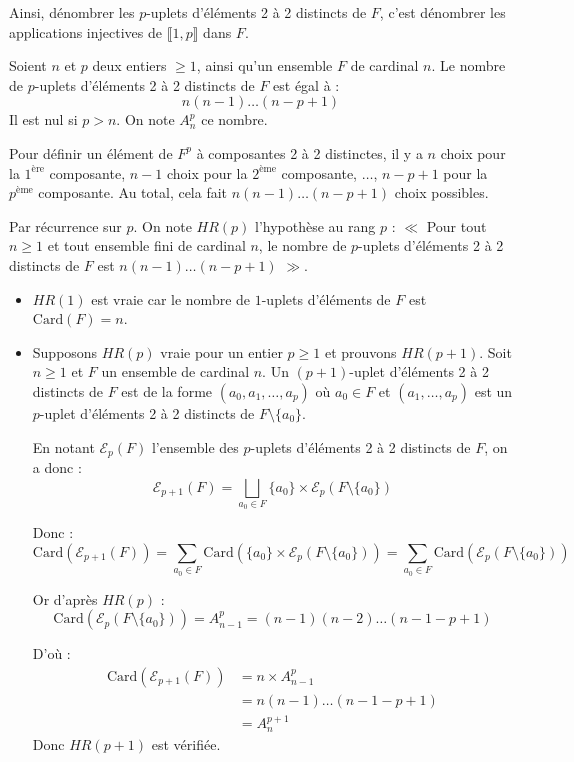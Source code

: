 \documentclass[a4paper,11pt]{article}
\begin{document}
Ainsi, dénombrer les $p$-uplets d'éléments 2 à 2 distincts de $F$, c'est dénombrer les applications injectives de $\llbracket 1, p \rrbracket$ dans $F$.

\begin{proposition}
  Soient $n$ et $p$ deux entiers $\ge 1$, ainsi qu'un ensemble $F$ de cardinal $n$. 
  Le nombre de $p$-uplets d'éléments 2 à 2 distincts de $F$ est égal à :
  $$ n(n-1)\dots(n-p+1) $$
  Il est nul si $p > n$.
  On note $A_n^p$ ce nombre.
\end{proposition}

\begin{demonstration}[Heuristique]
  Pour définir un élément de $F^p$ à composantes 2 à 2 distinctes, il y a $n$ choix pour la $1^{\text{ère}}$ composante, $n-1$ choix pour la $2^{\text{ème}}$ composante, $\dots$, $n-p+1$ pour la $p^{\text{ème}}$ composante. Au total, cela fait $n(n-1)\dots(n-p+1)$ choix possibles.
\end{demonstration}

\begin{demonstration}[Rigoureuse]
  Par récurrence sur $p$.
  On note $HR(p)$ l'hypothèse au rang $p$ : $\ll$ Pour tout $n \ge 1$ et tout ensemble fini de cardinal $n$, le nombre de $p$-uplets d'éléments 2 à 2 distincts de $F$ est $n(n-1)\dots(n-p+1)$ $\gg$.
  
  \begin{itemize}
    \item $HR(1)$ est vraie car le nombre de $1$-uplets d'éléments de $F$ est $\text{Card}(F) = n$.
    \item Supposons $HR(p)$ vraie pour un entier $p \ge 1$ et prouvons $HR(p+1)$.
    Soit $n \ge 1$ et $F$ un ensemble de cardinal $n$.
    Un $(p+1)$-uplet d'éléments 2 à 2 distincts de $F$ est de la forme $(a_0, a_1, \dots, a_p)$ où $a_0 \in F$ et $(a_1, \dots, a_p)$ est un $p$-uplet d'éléments 2 à 2 distincts de $F \setminus \{a_0\}$.
    
    En notant $\mathcal{E}_p(F)$ l'ensemble des $p$-uplets d'éléments 2 à 2 distincts de $F$, on a donc :
    $$ \mathcal{E}_{p+1}(F) = \bigsqcup_{a_0 \in F} \{a_0\} \times \mathcal{E}_p(F \setminus \{a_0\}) $$
    
    Donc :
    $$ \text{Card}(\mathcal{E}_{p+1}(F)) = \sum_{a_0 \in F} \text{Card}(\{a_0\} \times \mathcal{E}_p(F \setminus \{a_0\})) = \sum_{a_0 \in F} \text{Card}(\mathcal{E}_p(F \setminus \{a_0\})) $$
    
    Or d'après $HR(p)$ :
    $$ \text{Card}(\mathcal{E}_p(F \setminus \{a_0\})) = A_{n-1}^p = (n-1)(n-2)\dots(n-1-p+1) $$
    
    D'où :
    \begin{align*}
      \text{Card}(\mathcal{E}_{p+1}(F)) &= n \times A_{n-1}^p \\
                                        &= n(n-1)\dots(n-1-p+1) \\
                                        &= A_n^{p+1}
    \end{align*}
    Donc $HR(p+1)$ est vérifiée.
  \end{itemize}
\end{demonstration}
\end{document}
